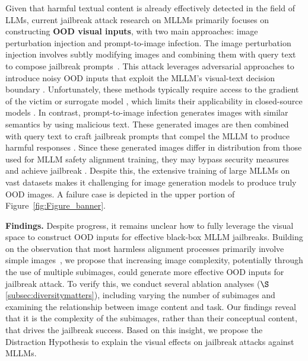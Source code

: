 Given that harmful textual content is already effectively detected in the field of LLMs, current jailbreak attack research on MLLMs primarily focuses on constructing \textbf{OOD visual inputs}, with two main approaches: image perturbation injection and prompt-to-image infection. The image perturbation injection involves subtly modifying images and combining them with query text to compose jailbreak prompts~\cite{wu2023jailbreaking}.
This attack leverages adversarial approaches \cite{wang2024transferable} to introduce noisy OOD inputs that exploit the MLLM’s visual-text decision boundary \cite{zhao2024evaluating}. Unfortunately, these methods typically require access to the gradient of the victim or surrogate model \cite{wang2024white}, which limits their applicability in closed-source models \cite{tu2023many}.
In contrast, prompt-to-image infection generates images with similar semantics by using malicious text. These generated images are then combined with query text to craft jailbreak prompts that compel the MLLM to produce harmful responses \cite{gong2023figstep,li2024images}. Since these generated images differ in distribution from those used for MLLM safety alignment training, they may bypass security measures and achieve jailbreak \cite{liu2023query,tao2024imgtrojan,chen2024bathe}.
Despite this, the extensive training of large MLLMs on vast datasets makes it challenging for image generation models to produce truly OOD images. A failure case is depicted in the upper portion of Figure~\ref{fig:Figure_banner}. 


\textbf{Findings.} Despite progress, it remains unclear how to fully leverage the visual space to construct OOD inputs for effective black-box MLLM jailbreaks. Building on the observation that most harmless alignment processes primarily involve simple images~\citep{gong2023figstep, li2024images, qi2024visual}, we propose that increasing image complexity, potentially through the use of multiple subimages, could generate more effective OOD inputs for jailbreak attack. To verify this, we conduct several ablation analyses ($\S$\ref{subsec:diversitymatters}), including varying the number of subimages and examining the relationship between image content and task. Our findings reveal that it is the complexity of the subimages, rather than their conceptual content, that drives the jailbreak success. Based on this insight, we propose the Distraction Hypothesis to explain the visual effects on jailbreak attacks against MLLMs.

